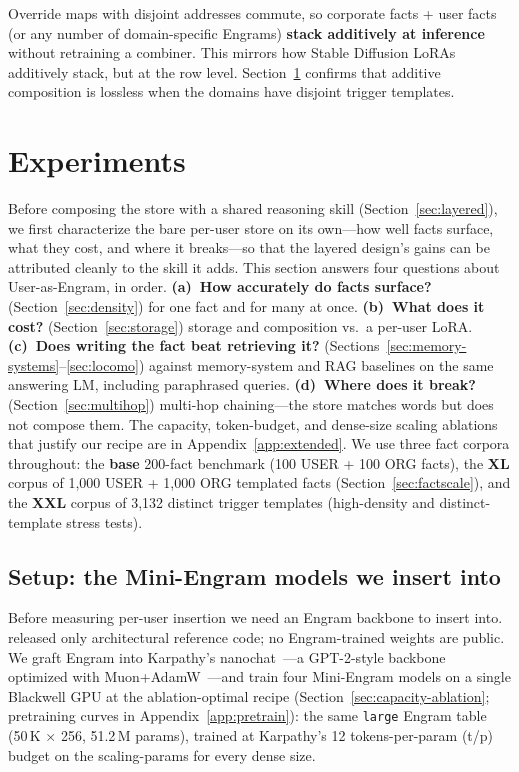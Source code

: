 \documentclass[letterpaper]{article} %
\begin{document}
Override maps with disjoint addresses commute, so corporate
facts + user facts (or any number of domain-specific Engrams)
\textbf{stack additively at inference} without retraining a
combiner. This mirrors how Stable Diffusion LoRAs additively
stack, but at the row level. Section~\ref{sec:experiments}
confirms that additive composition is lossless when the domains
have disjoint trigger templates.

\section{Experiments}
\label{sec:experiments}

Before composing the store with a shared reasoning skill
(Section~\ref{sec:layered}), we first characterize the bare
per-user store on its own---how well facts surface, what they cost,
and where it breaks---so that the layered design's gains can be
attributed cleanly to the skill it adds.
This section answers four questions about User-as-Engram, in order.
\textbf{(a)~How accurately do facts surface?}
(Section~\ref{sec:density}) for one fact and for many at once.
\textbf{(b)~What does it cost?} (Section~\ref{sec:storage}) storage
and composition vs.\ a per-user LoRA. \textbf{(c)~Does writing the
fact beat retrieving it?} (Sections~\ref{sec:memory-systems}--\ref{sec:locomo})
against memory-system and RAG baselines on the same answering LM,
including paraphrased queries. \textbf{(d)~Where does it break?}
(Section~\ref{sec:multihop}) multi-hop chaining---the store
matches words but does not compose them. The capacity, token-budget, and dense-size
scaling ablations that justify our recipe are in
Appendix~\ref{app:extended}.
We use three fact corpora throughout: the \textbf{base} 200-fact
benchmark (100 USER + 100 ORG facts), the \textbf{XL} corpus of
1{,}000 USER + 1{,}000 ORG templated facts
(Section~\ref{sec:factscale}), and the \textbf{XXL} corpus of
3{,}132 distinct trigger templates (high-density and
distinct-template stress tests).

\subsection{Setup: the Mini-Engram models we insert into}
\label{sec:repro}

Before measuring per-user insertion we need an Engram backbone to
insert into. \citet{cheng2026engram} released only architectural reference
code; no Engram-trained weights are public. We graft Engram into
Karpathy's nanochat~\citep{karpathy2026nanochat}---a GPT-2-style
backbone~\citep{radford2019gpt2} optimized with
Muon+AdamW~\citep{jordan2024muon}---and train four Mini-Engram
models on a single Blackwell GPU at the ablation-optimal recipe
(Section~\ref{sec:capacity-ablation}; pretraining curves in
Appendix~\ref{app:pretrain}): the same \texttt{large}
Engram table (50\,K $\times$ 256, 51.2\,M params), trained at
Karpathy's 12 tokens-per-param (t/p) budget on the scaling-params
for every dense size.
\end{document}
